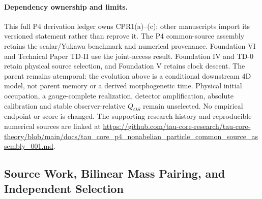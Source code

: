 \documentclass[11pt]{article}
\begin{document}
\paragraph{Dependency ownership and limits.}
This full P4 derivation ledger owns CPR1(a)--(c); other manuscripts import
its versioned statement rather than reprove it. The P4 common-source
assembly retains the scalar/Yukawa benchmark and numerical provenance.
Foundation VI and Technical Paper TD-II use the joint-access result.
Foundation IV and TD-0 retain
physical source selection, and Foundation V retains clock descent.
The parent remains atemporal: the evolution above is a conditional
downstream 4D model, not parent memory or a derived morphogenetic time.
Physical initial occupation, a gauge-complete realization, detector
amplification, absolute calibration and stable observer-relative $Q_{OS}$
remain unselected. No empirical endpoint or score is changed.
The supporting research history and reproducible numerical sources are linked at
\url{https://github.com/tau-core-research/tau-core-theory/blob/main/docs/tau_core_p4_nonabelian_particle_common_source_assembly_001.md}.

\subsection{Source Work, Bilinear Mass Pairing, and Independent Selection}
\label{sec:msi1}\hypertarget{msi1}{}
\end{document}
